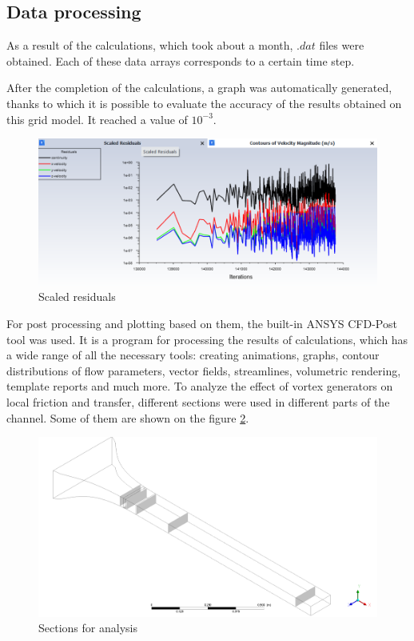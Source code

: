 \subsection{Data processing}
	As a result of the calculations, which took about a month, $.dat$ files were obtained. Each of these data arrays corresponds to a certain time step. 
	
	After the completion of the calculations, a graph was automatically generated, thanks to which it is possible to evaluate the accuracy of the results obtained on this grid model. It reached a value of $10^{-3}$.
	\begin{figure}[H]
		\centering
		\includegraphics[width=1\linewidth]{../Assets/scaledResiduals}
		\caption{Scaled residuals}
		\label{fig:scaledresiduals}
	\end{figure}
	
	For post processing and plotting based on them, the built-in ANSYS CFD-Post tool was used. It is a program for processing the results of calculations, which has a wide range of all the necessary tools: creating animations, graphs, contour distributions of flow parameters, vector fields, streamlines, volumetric rendering, template reports and much more. To analyze the effect of vortex generators on local friction and transfer, different sections were used in different parts of the channel. Some of them are shown on the figure \ref{fig:planesforanalysis}. 
	\begin{figure}[H]
		\centering
		\includegraphics[width=0.9\linewidth]{../Assets/1}
		\caption{Sections for analysis}
		\label{fig:planesforanalysis}
	\end{figure}
	
